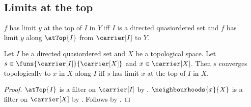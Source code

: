 \subsection{Limits at the top}

\begin{definition}\label{function_has_limit_at_top}
    $f$ has limit $y$ at the top of $I$ in $Y$ iff
        $I$ is a directed quasiordered set and
        $f$ has limit $y$ along $\atTop{I}$ from $\carrier[I]$ to $Y$.
\end{definition}

\begin{theorem}\label{net_convergence_iff_limit_at_top}
    Let $I$ be a directed quasiordered set and $X$ be a topological space.
    Let $s\in\funs{\carrier[I]}{\carrier[X]}$ and
        $x\in\carrier[X]$.
    Then $s$ converges topologically to $x$ in $X$ along $I$ iff
        $s$ has limit $x$ at the top of $I$ in $X$.
\end{theorem}
\begin{proof}
    $\atTop{I}$ is a filter on $\carrier[I]$ by
        .
    $\neighbourhoods{x}{X}$ is a filter on $\carrier[X]$ by
        .
    Follows by
        .
\end{proof}
